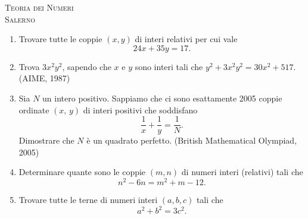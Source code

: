 \documentclass[a4paper]{article}
\theoremstyle{remark}
\theoremstyle{definition}
\begin{document}
%	
%	
%	

\begin{center}
	\vspace*{0,5 cm}
	{\Huge \textsc{Teoria dei Numeri}} \\
	\vspace{0,5 cm}
	\textsc{Salerno}
	\thispagestyle{empty}
	\vspace{0,7 cm}
\end{center}
\normalsize




\begin{enumerate}
	\item Trovare tutte le coppie $ (x, y) $ di interi relativi per cui vale
	\[ 24x + 35y = 17. \]
	
	\item Trova $ 3x^2y^2 $,
	sapendo che $ x $ e $ y $ sono interi tali che $ y^2+ 3x^2y^2= 30x^2 + 517. $ (AIME, 1987)\\
	
	\item Sia $ N $ un intero positivo. Sappiamo che ci sono esattamente 2005 coppie ordinate $ (x,\, y) $ di interi positivi che soddisfano
	\[ \frac{1}{x}+ \frac{1}{y} = \frac{1}{N}. \]
	Dimostrare che $ N $ è un quadrato perfetto. (British Mathematical Olympiad, 2005)\\
	
	\item  Determinare quante sono le coppie $ (m, n) $ di numeri interi (relativi) tali che
	\[n^2 - 6n = m^2 + m - 12.\]
	
	\item  Trovare tutte le terne di numeri interi $ (a, b, c) $ tali che
	\[ a^2 + b^2 = 3c^2. \]
	
\end{enumerate}
\end{document}
